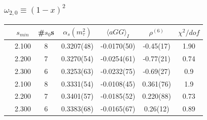 \documentclass{beamer}
\begin{document}
\begin{frame}
  \frametitle{\(\omega_{2,0} \equiv (1-x)^2\)}
  \centering
  \begin{tabular}{ccccccc}
    \toprule
    & \(s_{min}\) & \#\(s_0\)s & \(\alpha_s(m_\tau^2)\) & \(\langle aGG \rangle_I\) & \(\rho^{(6)}\) & \(\chi^2/dof\)  \\
    \midrule


    \parbox[t]{2mm}{}
    & 2.100 & 8 & 0.3207(48) & -0.0170(50) & -0.45(17) & 1.90 \\
    & 2.200 & 7 & 0.3270(54) & -0.0254(61) & -0.77(21) & 0.74 \\
    & 2.300 & 6 & 0.3253(63) & -0.0232(75) & -0.69(27) & 0.9  \\
    \midrule
    \parbox[t]{2mm}{} & 2.100 & 8 & 0.3331(54) & -0.0108(45) & 0.361(76) & 1.9 \\
    & 2.200 & 7  & 0.3401(57) & -0.0185(52) & 0.220(88) & 0.73 \\
    & 2.300 & 6  & 0.3383(68) & -0.0165(67) & 0.26(12) & 0.89 \\
    \bottomrule
  \end{tabular}
\end{frame}
\end{document}
